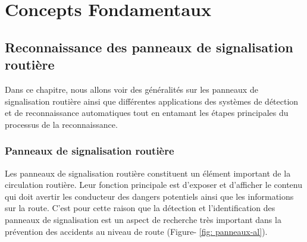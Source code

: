 \part{Concepts Fondamentaux }
\chapter{Reconnaissance des panneaux de signalisation routière}
\label{chap:premierchapitre}
\minitoc

Dans ce chapitre, nous allons voir des généralités sur les panneaux de signalisation routière ainsi que différentes applications des systèmes de détection et de reconnaissance automatiques tout en entamant les étapes principales du processus de la reconnaissance.

\section{Panneaux de signalisation routière}

Les panneaux de signalisation routière constituent un élément important de la circulation routière. Leur fonction principale est d’exposer et d’afficher le contenu qui doit avertir les conducteur des dangers potentiels ainsi que les informations sur la route. C’est pour cette raison que la détection et l’identification des panneaux de signalisation est un aspect de recherche très important dans la prévention des accidents au niveau de route (Figure- \ref{fig: panneaux-al}).


